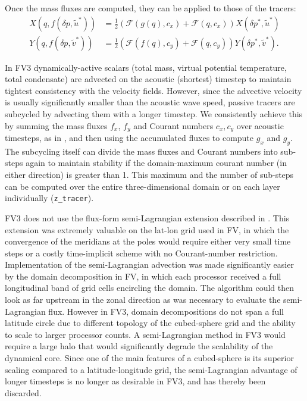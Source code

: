 \documentclass[10pt,letterpaper,margin=1in]{memoir}
\begin{document}
Once the mass fluxes are computed, they can be applied to those of the tracers:
\begin{equation}
\begin{aligned}
X(q, f(\delta p,\widetilde{u}^*))  &= \frac{1}{2} \left ( \mathcal{F} \left ( g(q), c_x \right ) + \mathcal{F} \left ( q, c_x \right ) \right ) X(\delta p^*,\widetilde{u}^*) \\
Y(q, f(\delta p,\widetilde{v}^*)) &= \frac{1}{2} \left ( \mathcal{F} \left ( f(q), c_y \right ) + \mathcal{F} \left ( q, c_y \right ) \right ) Y(\delta p^*,\widetilde{v}^*).
\end{aligned}
\end{equation}

In FV3 dynamically-active scalars (total mass, virtual potential temperature, total condensate) are advected on the acoustic (shortest) timestep to maintain tightest consistency with the velocity fields. However, since the advective velocity is usually significantly smaller than the acoustic wave speed, passive tracers are subcycled by advecting them with a longer timestep. We consistently achieve this by summing the mass fluxes $f_x$, $f_y$ and Courant numbers $c_x, c_y$ over acoustic timesteps, as in \citet{L04}, and then using the accumulated fluxes to compute $g_x$ and $g_y$. The subcycling itself can divide the mass fluxes and Courant numbers into sub-steps again to maintain stability if the domain-maximum courant number (in either direction) is greater than 1. This maximum and the number of sub-steps can be computed over the entire three-dimensional domain or on each layer individually (\texttt{z_tracer}).

FV3 does not use the flux-form semi-Lagrangian extension described in \citet{LR96}. This extension was extremely valuable on the lat-lon grid used in FV, in which the convergence of the meridians at the poles would require either very small time steps or a costly time-implicit scheme with no Courant-number restriction. Implementation of the semi-Lagrangian advection was made significantly easier by the domain decomposition in FV, in which each processor received a full longitudinal band of grid cells encircling the domain. The algorithm could then look as far upstream in the zonal direction as was necessary to evaluate the semi-Lagrangian flux. However in FV3, domain decompositions do not span a full latitude circle due to different topology of the cubed-sphere grid and the ability to scale to larger processor counts. A semi-Lagrangian method in FV3 would require a large halo that would significantly degrade the scalability of the dynamical core. Since one of the main features of a cubed-sphere is its superior scaling compared to a latitude-longitude grid, the semi-Lagrangian advantage of longer timesteps is no longer as desirable in FV3, and has thereby been discarded.
\end{document}
